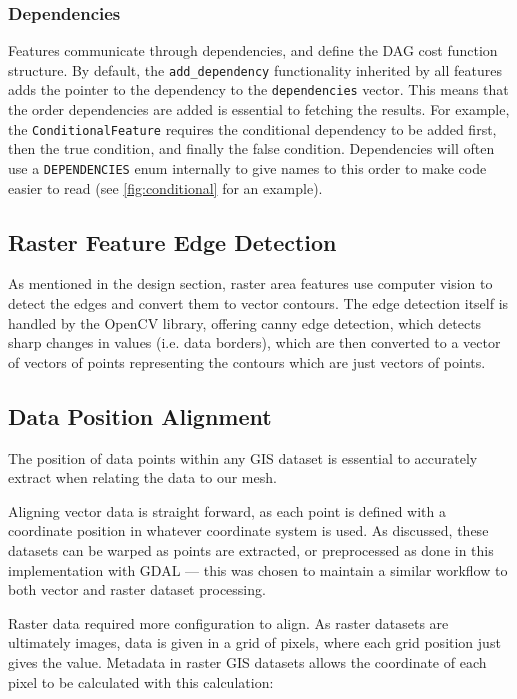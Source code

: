 \documentclass[12pt]{article}
\begin{document}
\subsubsection{Dependencies}

Features communicate through dependencies, and define the DAG cost function structure. By default, the \texttt{add\_dependency} functionality inherited by all features adds the pointer to the dependency to the \texttt{dependencies} vector. This means that the order dependencies are added is essential to fetching the results. For example, the \texttt{ConditionalFeature} requires the conditional dependency to be added first, then the true condition, and finally the false condition. Dependencies will often use a \texttt{DEPENDENCIES} enum internally to give names to this order to make code easier to read (see \autoref{fig:conditional} for an example).

\subsection{Raster Feature Edge Detection}

As mentioned in the design section, raster area features use computer vision to detect the edges and convert them to vector contours. The edge detection itself is handled by the OpenCV library, offering canny edge detection, which detects sharp changes in values (i.e. data borders), which are then converted to a vector of vectors of points representing the contours which are just vectors of points.

\subsection{Data Position Alignment}

The position of data points within any GIS dataset is essential to accurately extract when relating the data to our mesh.

Aligning vector data is straight forward, as each point is defined with a coordinate position in whatever coordinate system is used. As discussed, these datasets can be warped as points are extracted, or preprocessed as done in this implementation with GDAL --- this was chosen to maintain a similar workflow to both vector and raster dataset processing.

Raster data required more configuration to align. As raster datasets are ultimately images, data is given in a grid of pixels, where each grid position just gives the value. Metadata in raster GIS datasets allows the coordinate of each pixel to be calculated with this calculation:
\end{document}
